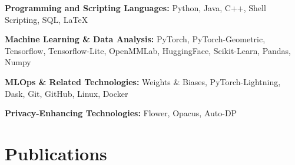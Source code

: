 \documentclass[11pt]{article}
\begin{document}
\begin{outerlist}
	\item \textbf{Programming and Scripting Languages:}\quad
	{Python, Java, C++, Shell Scripting, SQL, LaTeX}

	\item \textbf{Machine Learning \& Data Analysis:}\quad
	{PyTorch, PyTorch-Geometric, Tensorflow, Tensorflow-Lite, OpenMMLab, HuggingFace, Scikit-Learn, Pandas, Numpy}

	\item \textbf{MLOps \& Related Technologies:}\quad
	{Weights \& Biases, PyTorch-Lightning, Dask, Git, GitHub, Linux, Docker}

	\item \textbf{Privacy-Enhancing Technologies:}\quad
	{Flower, Opacus, Auto-DP}

\end{outerlist}


\section{Publications}
\end{document}
